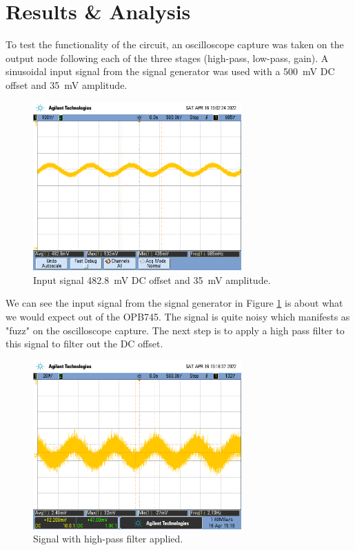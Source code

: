 \documentclass[CMPE]{../KGCOEReport}
\begin{document}
    \section*{Results \& Analysis}

	To test the functionality of the circuit, an oscilloscope capture was taken
	on the output node following each of the three stages (high-pass, low-pass, gain).
	A sinusoidal input signal from the signal generator was used with a
	\SI{500}{\milli\volt} DC offset and \SI{35}{\milli\volt} amplitude.

	\begin{figure}[h!]
        \centering
        \includegraphics[width=8cm]{scope_0}
        \caption{Input signal \SI{482.8}{\milli\volt} DC offset and \SI{35}{\milli\volt}
        amplitude.}
        \label{fig:input}
	\end{figure}

	We can see the input signal from the signal generator in Figure \ref{fig:input}
	is about what we would expect out of the OPB745.
	The signal is quite noisy which manifests as "fuzz" on the
	oscilloscope capture. The next step is to apply a high pass filter to this signal
	to filter out the DC offset.

	\begin{figure}[h!]
        \centering
        \includegraphics[width=8cm]{scope_2}
        \caption{Signal with high-pass filter applied.}
        \label{fig:high_pass}
	\end{figure}
\end{document}

